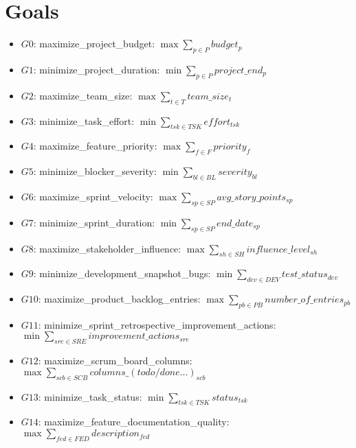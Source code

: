 \documentclass{article}
\begin{document}
\section{Goals}
\begin{itemize}
    \item $G0$: maximize\_project\_budget: $\max \sum_{p \in P} budget_p$
    \item $G1$: minimize\_project\_duration: $\min \sum_{p \in P} project\_end_p$
    \item $G2$: maximize\_team\_size: $\max \sum_{t \in T} team\_size_t$
    \item $G3$: minimize\_task\_effort: $\min \sum_{tsk \in TSK} effort_{tsk}$
    \item $G4$: maximize\_feature\_priority: $\max \sum_{f \in F} priority_f$
    \item $G5$: minimize\_blocker\_severity: $\min \sum_{bl \in BL} severity_{bl}$
    \item $G6$: maximize\_sprint\_velocity: $\max \sum_{sp \in SP} avg\_story\_points_{sp}$
    \item $G7$: minimize\_sprint\_duration: $\min \sum_{sp \in SP} end\_date_{sp}$
    \item $G8$: maximize\_stakeholder\_influence: $\max \sum_{sh \in SH} influence\_level_{sh}$
    \item $G9$: minimize\_development\_snapshot\_bugs: $\min \sum_{dev \in DEV} test\_status_{dev}$
    \item $G10$: maximize\_product\_backlog\_entries: $\max \sum_{pb \in PB} number\_of\_entries_{pb}$
    \item $G11$: minimize\_sprint\_retrospective\_improvement\_actions: $\min \sum_{sre \in SRE} improvement\_actions_{sre}$
    \item $G12$: maximize\_scrum\_board\_columns: $\max \sum_{scb \in SCB} columns\_(todo/done...)_{scb}$
    \item $G13$: minimize\_task\_status: $\min \sum_{tsk \in TSK} status_{tsk}$
    \item $G14$: maximize\_feature\_documentation\_quality: $\max \sum_{fed \in FED} description_{fed}$
\end{itemize}
\end{document}
